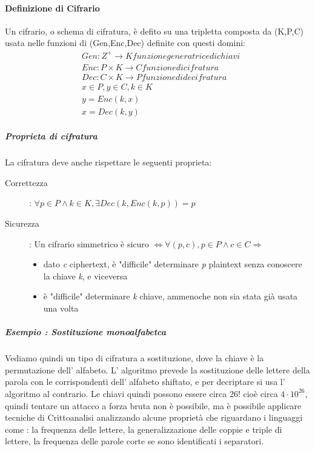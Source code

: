 \documentclass{article}
\begin{document}
    \paragraph{Definizione di Cifrario}
        Un cifrario, o schema di cifratura, è defito su una tripletta composta da (K,P,C) usata nelle funzioni di (Gen,Enc,Dec) definite con questi domini: 
         \begin{align}
            &Gen: Z^+ \to K funzione generatrice di chiavi\\  
            &Enc: P \times K \to C  funzione di cifratura\\
            &Dec : C \times K \to P funzione di decifratura\\
            &x \in P , y \in C , k \in K\\
            &y = Enc(k,x)\\
            &x = Dec(k,y)
        \end{align}
        \subparagraph{Proprieta di cifratura}
            La cifratura deve anche rispettare le seguenti proprieta: 
            \begin{description}
                 \item[Correttezza]: $\forall p \in P \land k \in K, \exists Dec(k,Enc(k,p)) = p$
                 \item[Sicurezza]:  Un cifrario simmetrico è sicuro $\iff \forall (p,c), p \in P \land c \in C  \Rightarrow$ 
                 \begin{itemize}
                            \item dato \textit{c} ciphertext, è "difficile" determinare \textit{p} plaintext senza conoscere la chiave \textit{k}, e viceversa
                            \item è "difficile" determinare \textit{k} chiave, ammenoche non sia stata già usata una volta
               \end{itemize}
            \end{description}

        \subparagraph{Esempio : Sostituzione monoalfabetca} 
            Vediamo quindi un tipo di cifratura a sostituzione, dove la chiave è la permutazione dell' alfabeto. L' algoritmo prevede la sostituzione delle lettere della parola con le corrispondenti dell' alfabeto shiftato, e per decriptare si usa l' algoritmo al contrario. Le chiavi quindi possono essere circa  26! cioè circa $4\cdot10^26$, quindi tentare un attacco a forza bruta non è possibile, ma è possibile applicare tecniche di Crittoanalisi analizzando alcune proprietà che riguardano i linguaggi come : la frequenza delle lettere, la generalizzazione delle coppie e triple di lettere, la frequenza delle parole corte se sono identificati i separatori.  
\end{document}
